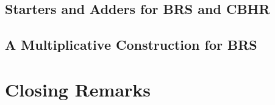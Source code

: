 \documentclass[a4paper, draft]{book}
\begin{document}
\section{Starters and Adders for BRS and CBHR}
  
\section{A Multiplicative Construction for BRS}
  

\chapter{Closing Remarks}
\label{ch:closing-remarks}
  

\backmatter
\printbibliography[title=References]
\end{document}
